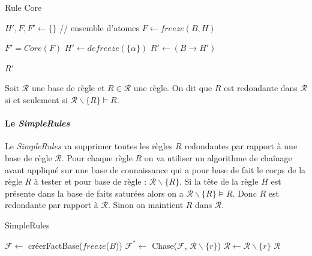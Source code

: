 \begin{algorithm}[H]\label{algo:ruleCore}
\caption{Rule Core} %
\SetAlgoLined
\DontPrintSemicolon
\SetAlgoLined
\DontPrintSemicolon
{}
    $H', F, F'\gets \{\} $ // ensemble d'atomes\;
    $F \gets freeze(B, H)$\;
   
    $F' = Core(F)$\;
    {
        {
            $H' \gets defreeze(\{\alpha\})$\;
        }
    }
    $R' \gets (B \rightarrow H')$\;

    \Return $R'$
\end{algorithm}

\begin{definition}
    Soit $\mathcal{R}$ une base de règle et $R \in \mathcal{R}$ une règle. On dit que $R$ est redondante dans $\mathcal{R}$ si et seulement si $\mathcal{R} \backslash\{R\} \vDash R$.
\end{definition}

\paragraph{Le \textit{SimpleRules}}
Le \textit{SimpleRules} va supprimer toutes les règles $R$ redondantes par rapport à une base de règle $\mathcal{R}$. Pour chaque règle $R$ on va utiliser un algorithme de chaînage avant appliqué sur une base de connaissance qui a pour base de fait le corps de la règle $R$ à tester et pour base de règle : $\mathcal{R} \backslash \{R\}$. Si la tête de la règle $H$ est présente dans la base de faits saturées alors on a $\mathcal{R} \backslash \{R\} \models R$. Donc $R$ est redondante par rapport à $\mathcal{R}$. Sinon on maintient $R$ dans $\mathcal{R}$. 
\newline



\begin{algorithm}[H]\label{algo:rule}
\caption{SimpleRules} %
\SetAlgoLined
\DontPrintSemicolon
\SetAlgoLined
\DontPrintSemicolon
{}
    {
         $\mathcal{F} \gets$ créerFactBase($freeze$($B$))\;
         $\mathcal{F}^* \gets$ Chase($\mathcal{F}$, $\mathcal{R} \backslash \{r\}$)\;
        {
            $\mathcal{R} \gets \mathcal{R} \backslash \{r\}$\;
        }
    }
    \Return $\mathcal{R}$
\end{algorithm}

